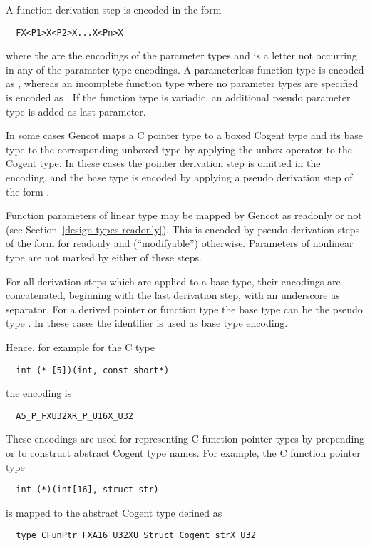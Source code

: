 A function derivation step is encoded in the form
\begin{verbatim}
  FX<P1>X<P2>X...X<Pn>X
\end{verbatim}
where the  are the encodings of the parameter types and  is a letter not occurring in 
any of the parameter type encodings. A parameterless function type is encoded as , whereas an
incomplete function type where no parameter types are specified is encoded as .
If the function type is variadic, an additional pseudo parameter type 
is added as last parameter. 

In some cases Gencot maps a C pointer type to a boxed Cogent type and its base type to the corresponding
unboxed type by applying the unbox operator \code{\#} to the Cogent type. In these cases the pointer derivation
step is omitted in the encoding, and the base type is encoded by applying a pseudo derivation step 
of the form .

Function parameters of linear type may be mapped by Gencot as readonly or not (see Section~\ref{design-types-readonly}). 
This is encoded by pseudo derivation steps of the form  for readonly and  (``modifyable'')
otherwise. Parameters of nonlinear type are not marked by either of these steps.

For all derivation steps which are applied to a base type, their encodings are concatenated, beginning with the 
last derivation step, with an underscore \code{\_} as separator. For a derived pointer or 
function type the base type can be the pseudo type . In these cases the identifier  is
used as base type encoding.

Hence, for example for the C type
\begin{verbatim}
  int (* [5])(int, const short*)
\end{verbatim}
the encoding is
\begin{verbatim}
  A5_P_FXU32XR_P_U16X_U32
\end{verbatim}

These encodings are used for representing C function pointer types by prepending  or 
to construct abstract Cogent type names. For example, the C function pointer type
\begin{verbatim}
  int (*)(int[16], struct str)
\end{verbatim}
is mapped to the abstract Cogent type defined as
\begin{verbatim}
  type CFunPtr_FXA16_U32XU_Struct_Cogent_strX_U32
\end{verbatim}
